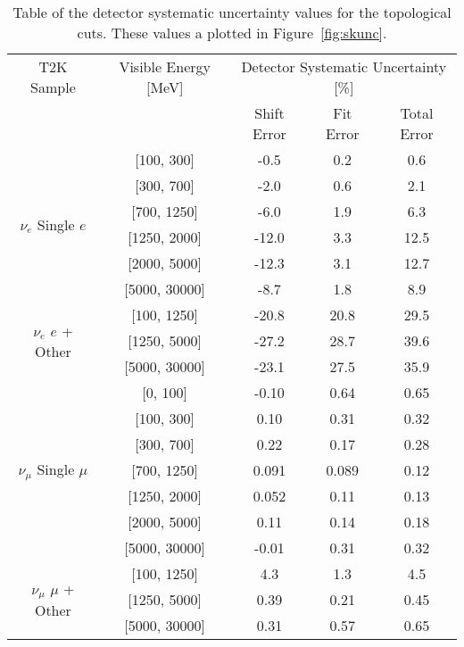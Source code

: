 \begin{table}[h]
  \centering
  \begin{tabular}{|c | c | c | c | c|}
    \hline\hline
    T2K Sample & Visible Energy [MeV] & \multicolumn{3}{|c|}{Detector Systematic Uncertainty [\%]} \\
    \cline{3-5}
    & & Shift Error & Fit Error & Total Error \\
    \hline
      \multirow{6}{*}{$\nu_{e}$ Single $e$}
       & [100, 300] &    -0.5  & 0.2 & 0.6   \\ 
       & [300, 700] &    -2.0  & 0.6 & 2.1   \\ 
       & [700, 1250] &   -6.0  & 1.9 & 6.3   \\ 
       & [1250, 2000] &  -12.0 & 3.3 & 12.5  \\ 
       & [2000, 5000] &  -12.3 & 3.1 & 12.7  \\ 
       & [5000, 30000] & -8.7  & 1.8 & 8.9   \\ 
      \hline
      \multirow{3}{*}{$\nu_{e}$ $e$ + Other}
       & [100, 1250] & -20.8  & 20.8 &  29.5    \\ 
       & [1250, 5000] & -27.2  & 28.7 &  39.6   \\ 
       & [5000, 30000] & -23.1  & 27.5 &  35.9  \\ 
      \hline
      \multirow{7}{*}{$\nu_{\mu}$ Single $\mu$}
       & [0, 100] &     -0.10    & 0.64  & 0.65   \\ 
       & [100, 300] &    0.10    & 0.31  &  0.32  \\ 
       & [300, 700] &    0.22    & 0.17  &  0.28  \\ 
       & [700, 1250] &   0.091   & 0.089 & 0.12   \\ 
       & [1250, 2000] &  0.052   & 0.11  & 0.13   \\ 
       & [2000, 5000] &  0.11    & 0.14  & 0.18   \\ 
       & [5000, 30000] & -0.01   & 0.31  & 0.32   \\ 
      \hline
      \multirow{3}{*}{$\nu_{\mu}$ $\mu$ + Other}
       & [100, 1250] &   4.3    & 1.3 &  4.5  \\ 
       & [1250, 5000] &   0.39   & 0.21 & 0.45 \\ 
       & [5000, 30000] &   0.31  & 0.57 & 0.65  \\ 
      \hline
  \end{tabular}
  \caption{Table of the detector systematic uncertainty values for the
  topological cuts. These values a plotted in Figure~\ref{fig:skunc}.}
  \label{tab:skerr}
\end{table}

